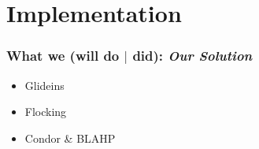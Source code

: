 \documentclass[11pt]{article}
\begin{document}
\section{Implementation}
\label{sec:Implementation}

\subsubsection*{What we (will do $|$ did): {\em Our Solution}}
\begin{itemize}

\item Glideins

\item Flocking

\item Condor \& BLAHP




\end{itemize}





\end{document}
